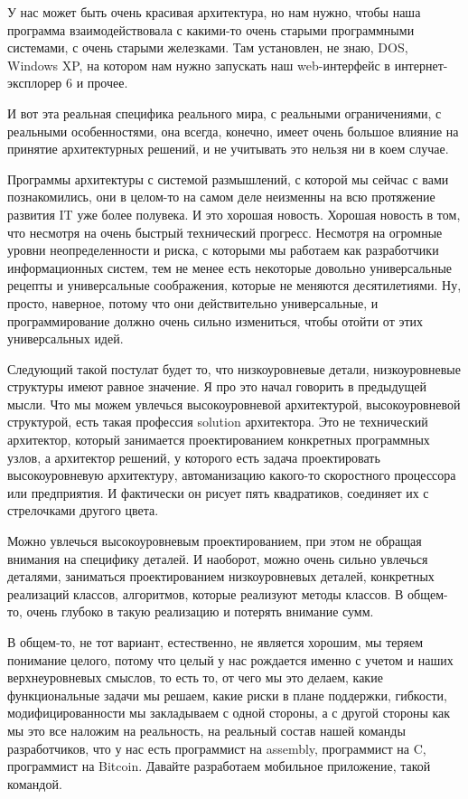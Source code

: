 У нас может быть очень красивая архитектура, но нам нужно, чтобы наша программа взаимодействовала с какими-то очень старыми программными системами, с очень старыми железками. Там установлен, не знаю, DOS, Windows XP, на котором нам нужно запускать наш web-интерфейс в интернет-эксплорер 6 и прочее.

И вот эта реальная специфика реального мира, с реальными ограничениями, с реальными особенностями, она всегда, конечно, имеет очень большое влияние на принятие архитектурных решений, и не учитывать это нельзя ни в коем случае.

Программы архитектуры с системой размышлений, с которой мы сейчас с вами познакомились, они в целом-то на самом деле неизменны на всю протяжение развития IT уже более полувека. И это хорошая новость. Хорошая новость в том, что несмотря на очень быстрый технический прогресс. Несмотря на огромные уровни неопределенности и риска, с которыми мы работаем как разработчики информационных систем, тем не менее есть некоторые довольно универсальные рецепты и универсальные соображения, которые не меняются десятилетиями. 
Ну, просто, наверное, потому что они действительно универсальные, и программирование должно очень сильно измениться, чтобы отойти от этих универсальных идей.

Следующий такой постулат будет то, что низкоуровневые детали, низкоуровневые структуры имеют равное значение. Я про это начал говорить в предыдущей мысли. Что мы можем увлечься высокоуровневой архитектурой, высокоуровневой структурой, есть такая профессия solution архитектора. Это не технический архитектор, который занимается проектированием конкретных программных узлов, а архитектор решений, у которого есть задача проектировать высокоуровневую архитектуру, автоманизацию какого-то скоростного процессора или предприятия. И фактически он рисует пять квадратиков, соединяет их с стрелочками другого цвета.

Можно увлечься высокоуровневым проектированием, при этом не обращая внимания на специфику деталей. И наоборот, можно очень сильно увлечься деталями, заниматься проектированием низкоуровневых деталей, конкретных реализаций классов, алгоритмов, которые реализуют методы классов. В общем-то, очень глубоко в такую реализацию и потерять внимание сумм. 

В общем-то, не тот вариант, естественно, не является хорошим, мы теряем понимание целого, потому что целый у нас рождается именно с учетом и наших верхнеуровневых смыслов, то есть то, от чего мы это делаем, какие функциональные задачи мы решаем, какие риски в плане поддержки, гибкости, модифицированности мы закладываем с одной стороны, а с другой стороны как мы это все наложим на реальность, на реальный состав нашей команды разработчиков, что у нас есть программист на assembly, программист на C, программист на Bitcoin. Давайте разработаем мобильное приложение, такой командой.


